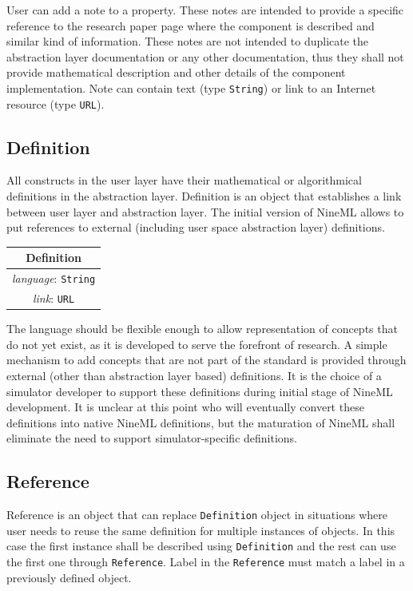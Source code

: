 \documentclass{article}
\begin{document}
User can add a note to a property. These notes are
intended to provide a specific reference to the research paper page
where the component is described and similar kind of information. These
notes are not intended to duplicate the abstraction layer documentation
or any other documentation, thus they shall not provide mathematical
description and other details of the component implementation. Note can
contain text (type {\tt String}) or link to an Internet resource (type
{\tt URL}).

\subsection{Definition}

All constructs in the user layer have their mathematical or algorithmical
definitions in the abstraction layer. Definition is an object that
establishes a link between user layer and abstraction layer. The initial
version of NineML allows to put references to external (including user
space abstraction layer) definitions.

\begin{table}[htb]
\center
\begin{tabular}{|c|}
\hline
\hline
Definition \\
\hline
\hline
{\em language}: {\tt String} \\
\hline
{\em link}: {\tt URL}\\
\hline
\end{tabular}
\end{table}

The language should be flexible enough to allow representation of concepts
that do not yet exist, as it is developed to serve the forefront of research.
A simple mechanism to add concepts that are not part of the standard is
provided through external (other than abstraction layer based) definitions.
It is the choice of a simulator developer to support these definitions during
initial stage of NineML development. It is unclear at this point who will
eventually convert these definitions into native NineML definitions, but the
maturation of NineML shall eliminate the need to support simulator-specific
definitions.

\subsection{Reference}

Reference is an object that can replace {\tt Definition} object in situations
where user needs to reuse the same definition for multiple instances of
objects. In this case the first instance shall be described using
{\tt Definition} and the rest can use the first one through {\tt Reference}.
Label in the {\tt Reference} must match a label in a previously defined
object.
\end{document}
